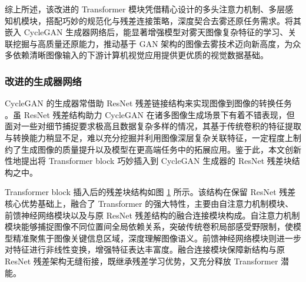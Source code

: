 综上所述，该改进的 Transformer 模块凭借精心设计的多头注意力机制、多层感知机模块，搭配巧妙的规范化与残差连接策略，深度契合去雾还原任务需求。将其嵌入 CycleGAN 生成器网络后，能显著增强模型对雾天图像复杂特征的学习、关联挖掘与高质量还原能力，推动基于 GAN 架构的图像去雾技术迈向新高度，为众多依赖清晰图像输入的下游计算机视觉应用提供更优质的视觉数据基础。

\subsubsection{改进的生成器网络}

CycleGAN 的生成器常借助 ResNet 残差链接结构来实现图像到图像的转换任务 。虽 ResNet 残差结构助力 CycleGAN 在诸多图像生成场景下有着不错表现，但面对一些对细节捕捉要求极高且数据复杂多样的情况，其基于传统卷积的特征提取与转换能力稍显不足，难以充分挖掘并利用图像深层复杂关联特征，一定程度上制约了生成图像的质量提升以及模型在更高端任务中的拓展应用。鉴于此，本文创新性地提出将 Transformer block 巧妙插入到 CycleGAN 生成器的 ResNet 残差块结构之中。

Transformer block 插入后的残差块结构如图 \ref{fig:cganformer} 
所示。该结构在保留 ResNet 残差核心优势基础上，融合了 Transformer 的强大特性，主要由自注意力机制模块、前馈神经网络模块以及与原 ResNet 残差结构的融合连接模块构成。自注意力机制模块能够捕捉图像不同位置间全局依赖关系，突破传统卷积局部感受野限制，使模型精准聚焦于图像关键信息区域，深度理解图像语义。前馈神经网络模块则进一步对特征进行非线性变换，增强特征表达丰富度。融合连接模块保障新结构与原 ResNet 残差架构无缝衔接，既继承残差学习优势，又充分释放 Transformer 潜能。

\begin{figure}[htb]
    \centering
    \captionsetup{font=footnotesize}
    \label{fig:cganformer}
\end{figure}

